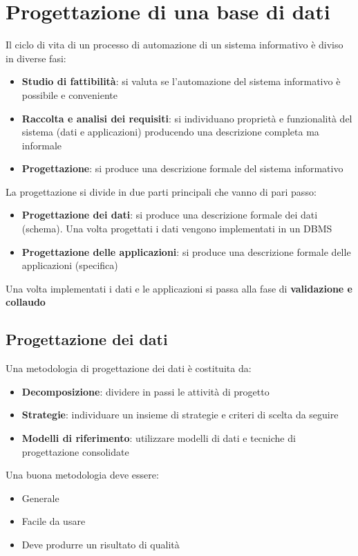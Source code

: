 \documentclass[a4paper,twoside]{article}
\begin{document}
\section{Progettazione di una base di dati}
Il ciclo di vita di un processo di automazione di un sistema informativo è diviso in diverse
fasi:
\begin{itemize}
  \item \textbf{Studio di fattibilità}: si valuta se l'automazione del sistema
    informativo è possibile e conveniente
  \item \textbf{Raccolta e analisi dei requisiti}: si individuano proprietà e funzionalità
    del sistema (dati e applicazioni) producendo una descrizione completa ma informale
  \item \textbf{Progettazione}: si produce una descrizione formale del sistema
    informativo
\end{itemize}
La progettazione si divide in due parti principali che vanno di pari passo:
\begin{itemize}
  \item \textbf{Progettazione dei dati}: si produce una descrizione formale dei dati
    (schema). Una volta progettati i dati vengono implementati in un DBMS
  \item \textbf{Progettazione delle applicazioni}: si produce una descrizione formale
    delle applicazioni (specifica)
\end{itemize}
Una volta implementati i dati e le applicazioni si passa alla fase di \textbf{validazione
e collaudo}

\subsection{Progettazione dei dati}
Una metodologia di progettazione dei dati è costituita da:
\begin{itemize}
  \item \textbf{Decomposizione}: dividere in passi le attività di progetto
  \item \textbf{Strategie}: individuare un insieme di strategie e criteri di scelta da
    seguire
  \item \textbf{Modelli di riferimento}: utilizzare modelli di dati e tecniche di
    progettazione consolidate
\end{itemize}
Una buona metodologia deve essere:
\begin{itemize}
  \item Generale
  \item Facile da usare
  \item Deve produrre un risultato di qualità
\end{itemize}
\end{document}
